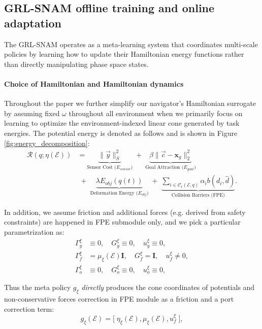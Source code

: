 \subsection{GRL-SNAM offline training and online adaptation}
\label{subsec:navigator_meta_learner}

The GRL-SNAM operates as a meta-learning system that coordinates multi-scale policies by learning how to update their Hamiltonian energy functions rather than directly manipulating phase space states.


\paragraph{Choice of Hamiltonian and Hamiltonian dynamics}
Throughout the paper we further simplify our navigator's Hamiltonian surrogate by assuming fixed $\omega$ throughout all environment when we primarily focus on learning to optimize the
environment-indexed linear cone generated by task energies. The potential energy is denoted as follows and is shown in Figure \ref{fig:energy_decomposition}:  
\begin{equation}
\begin{aligned}
\mathcal{R}(q; \eta(\mathcal E)) &= \underbrace{\|\vec{y}\|_{S}^2}_{\text{Sensor Cost ($E_{sensor}$)}}
\;+\;
\underbrace{\beta\|\vec{c}-\mathbf{x}_g\|_2^2}_{\text{Goal Attraction ($E_{goal}$)}} \\ &\;+\;
\underbrace{\lambda E_{obj}(q(t))}_{\text{Deformation Energy ($E_{obj}$)}} \;+\;
\underbrace{\sum_{i\in\mathcal{C}_t(\mathcal{E},q)} \alpha_i b(d_i,\hat{d})}_{\text{Collision Barriers (FPE)}} .
\end{aligned}
\end{equation}


In addition, we assume friction and additional forces (e.g. derived from safety constraints) are happened in FPE submodule only, and we pick a particular parametrization as:
\begin{equation}
\begin{aligned}
    \Gamma_y^{\xi} &\equiv 0 ,\quad G_y^{\xi}\equiv 0,\quad u_y^{\xi}\equiv 0, \\
    \Gamma_f^{\xi} &=\mu_\xi(\mathcal{E})\mathbf{I},\quad G_f^{\xi}=\mathbf{I}, \quad u_f^{\xi}\ne 0,\\
    \Gamma_o^{\xi} &\equiv 0 ,\quad G_o^{\xi}\equiv 0,\quad u_o^{\xi}\equiv 0, 
\end{aligned}
\end{equation}

Thus the meta policy $g_\xi$ \emph{directly} produces the cone coordinates of potentials and non-conservative forces correction in FPE module as a friction and a port correction term:
\begin{equation}
g_{\xi}(\mathcal{E})=\big[\;\eta_{\xi}(\mathcal{E}), \mu_\xi(\mathcal{E}) ,u_f^{\xi}\;],    
\label{eq:def:score:function:g}
\end{equation}

